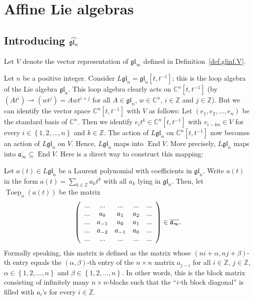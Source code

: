 \documentclass[etingof-lie.tex]{subfiles}
\begin{document}
\section{Affine Lie algebras}

\subsection{Introducing
\texorpdfstring{$\protect\widehat{\mathfrak{gl}_{n}}$}{gl-n-hat}}

\begin{definition}
\label{def.glnhat}Let $V$ denote the vector representation of $\mathfrak{gl}%
_{\infty}$ defined in Definition~\ref{def.glinf.V}.

Let $n$ be a positive integer. Consider $L\mathfrak{gl}_{n}=\mathfrak{gl}%
_{n}\left[  t,t^{-1}\right]  $; this is the loop algebra of the Lie algebra
$\mathfrak{gl}_{n}$. This loop algebra clearly acts on $\mathbb{C}^{n}\left[
t,t^{-1}\right]  $ (by $\left(  At^{i}\right)  \rightharpoonup\left(
wt^{j}\right)  =Awt^{i+j}$ for all $A\in\mathfrak{gl}_{n}$, $w\in
\mathbb{C}^{n}$, $i\in\mathbb{Z}$ and $j\in\mathbb{Z}$). But we can identify
the vector space $\mathbb{C}^{n}\left[  t,t^{-1}\right]  $ with $V$ as
follows: Let $\left(  e_{1},e_{2},...,e_{n}\right)  $ be the standard basis of
$\mathbb{C}^{n}$. Then we identify $e_{i}t^{k}\in\mathbb{C}^{n}\left[
t,t^{-1}\right]  $ with $v_{i-kn}\in V$ for every $i\in\left\{
1,2,...,n\right\}  $ and $k\in\mathbb{Z}$. The action of $L\mathfrak{gl}_{n}$
on $\mathbb{C}^{n}\left[  t,t^{-1}\right]  $ now becomes an action of
$L\mathfrak{gl}_{n}$ on $V$. Hence, $L\mathfrak{gl}_{n}$ maps into
$\operatorname*{End}V$. More precisely, $L\mathfrak{gl}_{n}$ maps into
$\overline{\mathfrak{a}_{\infty}}\subseteq\operatorname*{End}V$. Here is a
direct way to construct this mapping:

Let $a\left(  t\right)  \in L\mathfrak{gl}_{n}$ be a Laurent polynomial with
coefficients in $\mathfrak{gl}_{n}$. Write $a\left(  t\right)  $ in the form
$a\left(  t\right)  =\sum\limits_{k\in\mathbb{Z}}a_{k}t^{k}$ with all $a_{k}$
lying in $\mathfrak{gl}_{n}$. Then, let $\operatorname*{Toep}\nolimits_{n}%
\left(  a\left(  t\right)  \right)  $ be the matrix%
\[
\left(
\begin{array}
[c]{ccccc}%
... & ... & ... & ... & ...\\
... & a_{0} & a_{1} & a_{2} & ...\\
... & a_{-1} & a_{0} & a_{1} & ...\\
... & a_{-2} & a_{-1} & a_{0} & ...\\
... & ... & ... & ... & ...
\end{array}
\right)  \in\overline{\mathfrak{a}_{\infty}}.
\]
Formally speaking, this matrix is defined as the matrix whose $\left(
ni+\alpha,nj+\beta\right)  $-th entry equals the $\left(  \alpha,\beta\right)
$-th entry of the $n\times n$ matrix $a_{j-i}$ for all $i\in\mathbb{Z}$,
$j\in\mathbb{Z}$, $\alpha\in\left\{  1,2,...,n\right\}  $ and $\beta
\in\left\{  1,2,...,n\right\}  $. In other words, this is the block matrix
consisting of infinitely many $n\times n$-blocks such that the ``$i$-th block
diagonal'' is filled with $a_{i}$'s for every $i\in\mathbb{Z}$.


\end{definition}
\end{document}
